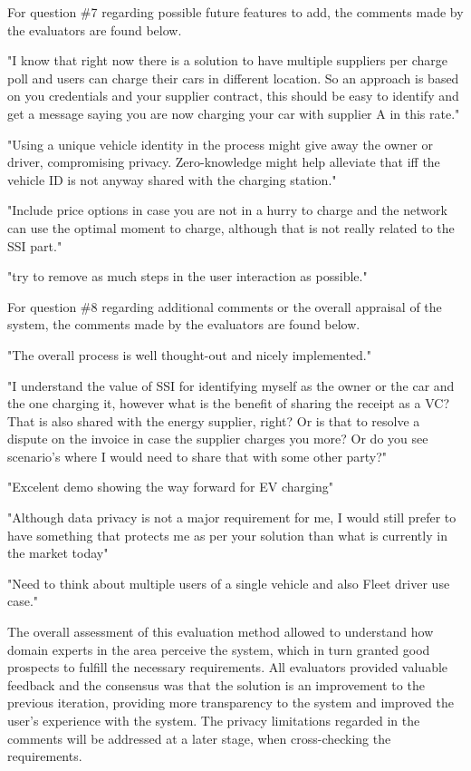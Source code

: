 For question \#7 regarding possible future features to add, the comments made by the evaluators are found below.

\begin{spverbatim}
"I know that right now there is a solution to have multiple suppliers per charge poll and users can charge their cars in different location. So an approach is based on you credentials and your supplier contract, this should be easy to identify and get a message saying you are now charging your car with supplier A in this rate."
    
"Using a unique vehicle identity in the process might give away the owner or driver, compromising privacy. Zero-knowledge might help alleviate that iff the vehicle ID is not anyway shared with the charging station."

"Include price options in case you are not in a hurry to charge and the network can use the optimal moment to charge, although that is not really related to the SSI part."

"try to remove as much steps in the user interaction as possible."

\end{spverbatim}

For question \#8 regarding additional comments or the overall appraisal of the system, the comments made by the evaluators are found below.

\begin{spverbatim}
"The overall process is well thought-out and nicely implemented."

"I understand the value of SSI for identifying myself as the owner or the car and the one charging it, however what is the benefit of sharing the receipt as a VC? That is also shared with the energy supplier, right? Or is that to resolve a dispute on the invoice in case the supplier charges you more? Or do you see scenario's where I would need to share that with some other party?"

"Excelent demo showing the way forward for EV charging"

"Although data privacy is not a major requirement for me, I would still prefer to have something that protects me as per your solution than what is currently in the market today"

"Need to think about multiple users of a single vehicle and also Fleet driver use case."

\end{spverbatim}

The overall assessment of this evaluation method allowed to understand how domain experts in the area perceive the system, which in turn granted good prospects to fulfill the necessary requirements. All evaluators provided valuable feedback and the consensus was that the solution is an improvement to the previous iteration, providing more transparency to the system and improved the user's experience with the system. The privacy limitations regarded in the comments will be addressed at a later stage, when cross-checking the requirements.


